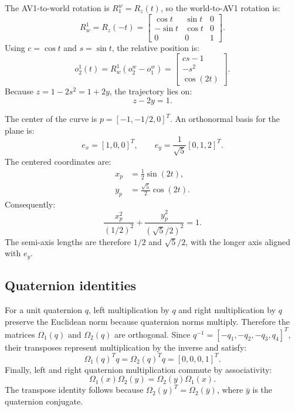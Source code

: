 \documentclass[letterpaper, 10 pt, conference]{ieeeconf}
\begin{document}
The AV1-to-world rotation is \(R_1^w=R_z(t)\), so the world-to-AV1 rotation is:
\begin{equation}
R_w^1=R_z(-t)=
\begin{bmatrix}
\cos t&\sin t&0\\
-\sin t&\cos t&0\\
0&0&1
\end{bmatrix}.
\label{eq:rotation}
\end{equation}
Using \(c=\cos t\) and \(s=\sin t\), the relative position is:
\begin{equation}
o_2^1(t)=R_w^1(o_2^w-o_1^w)=
\begin{bmatrix}
cs-1\\-s^2\\\cos(2t)
\end{bmatrix}.
\label{eq:relative}
\end{equation}
Because \(z=1-2s^2=1+2y\), the trajectory lies on:
\begin{equation}
z-2y=1.
\label{eq:plane}
\end{equation}

The center of the curve is \(p=[-1,-1/2,0]^T\). An orthonormal basis for the plane is:
\begin{equation}
e_x=[1,0,0]^T,\qquad e_y=\frac{1}{\sqrt{5}}[0,1,2]^T.
\end{equation}
The centered coordinates are:
\begin{align}
x_p&=\frac{1}{2}\sin(2t),\\
y_p&=\frac{\sqrt{5}}{2}\cos(2t).
\end{align}
Consequently:
\begin{equation}
\frac{x_p^2}{(1/2)^2}+\frac{y_p^2}{(\sqrt{5}/2)^2}=1.
\label{eq:ellipse}
\end{equation}
The semi-axis lengths are therefore \(1/2\) and \(\sqrt{5}/2\), with the longer axis aligned with \(e_y\).

\subsection{Quaternion identities}
For a unit quaternion \(q\), left multiplication by \(q\) and right multiplication by \(q\) preserve the Euclidean norm because quaternion norms multiply. Therefore the matrices \(\Omega_1(q)\) and \(\Omega_2(q)\) are orthogonal. Since \(q^{-1}=[-q_1,-q_2,-q_3,q_4]^T\), their transposes represent multiplication by the inverse and satisfy:
\begin{equation}
\Omega_1(q)^Tq=\Omega_2(q)^Tq=[0,0,0,1]^T.
\end{equation}
Finally, left and right quaternion multiplication commute by associativity:
\begin{equation}
\Omega_1(x)\Omega_2(y)=\Omega_2(y)\Omega_1(x).
\end{equation}
The transpose identity follows because \(\Omega_2(y)^T=\Omega_2(\bar y)\), where \(\bar y\) is the quaternion conjugate.
\end{document}
